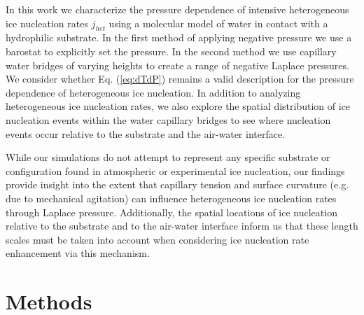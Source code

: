 \documentclass[journal abbreviation, manuscript]{copernicus}
\begin{document}
In this work we characterize the pressure dependence of intensive heterogeneous ice nucleation rates $j_{het}$ using a molecular model of water in contact with a hydrophilic substrate. In the first method of applying negative pressure we use a barostat to explicitly set the pressure. In the second method we use capillary water bridges of varying heights to create a range of negative Laplace pressures. We consider whether Eq. (\ref{eq:dTdP}) remains a valid description for the pressure dependence of heterogeneous ice nucleation. In addition to analyzing heterogeneous ice nucleation rates, we also explore the spatial distribution of ice nucleation events within the water capillary bridges to see where nucleation events occur relative to the substrate and the air-water interface. %

While our simulations do not attempt to represent any specific substrate or configuration found in atmospheric or experimental ice nucleation, our findings provide insight into the extent that capillary tension and surface curvature (e.g. due to mechanical agitation) can influence heterogeneous ice nucleation rates through Laplace pressure.  Additionally, the spatial locations of ice nucleation relative to the substrate and to the air-water interface inform us that these length scales must be taken into account when considering ice nucleation rate enhancement via this mechanism.








\section{Methods}
\end{document}
